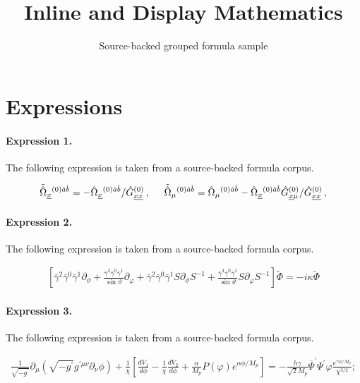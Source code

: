 \documentclass[11pt]{article}
\title{Inline and Display Mathematics}
\author{Source-backed grouped formula sample}
\date{}
\begin{document}
\maketitle
\section{Expressions}
\paragraph{Expression 1.} The following expression is taken from a source-backed formula corpus.

\begin{align*}\tilde{\hat{\Omega}}_{\underline{x}}{}^{(0)\hat{a}\hat{b}} =-\hat{\Omega}_{\underline{x}}{}^{(0)\hat{a}\hat{b}} /\hat{G}_{\underline{xx}}^{(0)}\, ,\hspace{.5cm}\tilde{\hat{\Omega}}_{\mu}{}^{(0)\hat{a}\hat{b}} =\hat{\Omega}_{\mu}{}^{(0)\hat{a}\hat{b}}-\hat{\Omega}_{\underline{x}}{}^{(0)\hat{a}\hat{b}}\hat{G}_{\underline{x}\mu}^{(0)}/\hat{G}^{(0)}_{\underline{xx}}\, ,\end{align*}

\paragraph{Expression 2.} The following expression is taken from a source-backed formula corpus.

\begin{align*}\left[ \bar \gamma ^2\bar \gamma ^0\bar \gamma ^1\partial_\vartheta +\frac{\bar \gamma ^3\bar \gamma ^0\bar \gamma ^1}{\sin \vartheta}\partial _\varphi +\bar \gamma ^2\bar \gamma ^0\bar \gamma ^1S\partial_\vartheta S^{-1}+\frac{\bar \gamma ^3\bar \gamma ^0\bar \gamma ^1}{\sin\vartheta }S\partial _\varphi S^{-1}\right] \tilde \Phi =-i\kappa \tilde\Phi\end{align*}

\paragraph{Expression 3.} The following expression is taken from a source-backed formula corpus.

\begin{align*}\frac{1}{\sqrt{-g^{\prime}}}\partial_{\mu}(\sqrt{-g^{\prime}}g^{\prime\mu\nu}\partial_{\nu}\phi)+ \frac{1}{\chi}\left[\frac{dV_{1}}{d\phi}-\frac{1}{\chi}\frac{dV_{2}}{d\phi}+\frac{\alpha}{M_{p}}P(\varphi)e^{\alpha\phi /M_{p}}\right]=-\frac{h\gamma}{\sqrt{2}M_{p}}\overline{\Psi}^{\prime}\Psi^{\prime} \varphi \frac{e^{\gamma\phi/M_{p}}}{\chi^{3/2}}; \end{align*}
\end{document}

